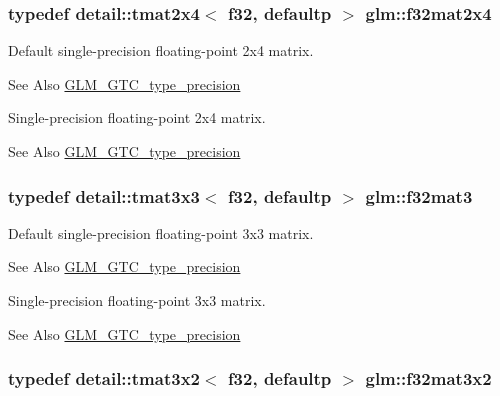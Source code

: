 \hypertarget{group__gtc__type__precision_gaba05bfeff59b12ea8e8ad2f6bfd8eece}{
\subsubsection[{f32mat2x4}]{\setlength{\rightskip}{0pt plus 5cm}typedef detail\-::tmat2x4$<$ f32, defaultp $>$ {\bf glm\-::f32mat2x4}}}\label{group__gtc__type__precision_gaba05bfeff59b12ea8e8ad2f6bfd8eece}
Default single-\/precision floating-\/point 2x4 matrix. \begin{DoxySeeAlso}{See Also}
\hyperlink{group__gtc__type__precision}{G\-L\-M\-\_\-\-G\-T\-C\-\_\-type\-\_\-precision}
\end{DoxySeeAlso}
Single-\/precision floating-\/point 2x4 matrix. \begin{DoxySeeAlso}{See Also}
\hyperlink{group__gtc__type__precision}{G\-L\-M\-\_\-\-G\-T\-C\-\_\-type\-\_\-precision} 
\end{DoxySeeAlso}
\hypertarget{group__gtc__type__precision_gaf8d666dea6f652c21f0c1515ce522090}{
\subsubsection[{f32mat3}]{\setlength{\rightskip}{0pt plus 5cm}typedef detail\-::tmat3x3$<$ f32, defaultp $>$ {\bf glm\-::f32mat3}}}\label{group__gtc__type__precision_gaf8d666dea6f652c21f0c1515ce522090}
Default single-\/precision floating-\/point 3x3 matrix. \begin{DoxySeeAlso}{See Also}
\hyperlink{group__gtc__type__precision}{G\-L\-M\-\_\-\-G\-T\-C\-\_\-type\-\_\-precision}
\end{DoxySeeAlso}
Single-\/precision floating-\/point 3x3 matrix. \begin{DoxySeeAlso}{See Also}
\hyperlink{group__gtc__type__precision}{G\-L\-M\-\_\-\-G\-T\-C\-\_\-type\-\_\-precision} 
\end{DoxySeeAlso}
\hypertarget{group__gtc__type__precision_ga43fa9ba1875db74cba2cea33321a77ff}{
\subsubsection[{f32mat3x2}]{\setlength{\rightskip}{0pt plus 5cm}typedef detail\-::tmat3x2$<$ f32, defaultp $>$ {\bf glm\-::f32mat3x2}}}\label{group__gtc__type__precision_ga43fa9ba1875db74cba2cea33321a77ff}
